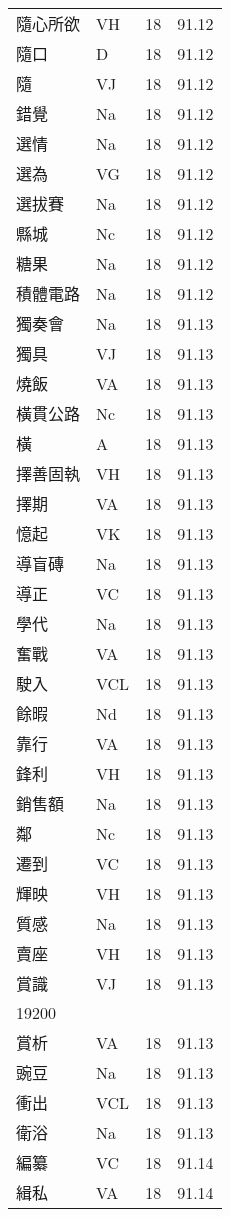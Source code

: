 \documentclass[twocolumn]{book}
\begin{document}
\begin{supertabular}{llrr}
隨心所欲 & VH & 18 &  91.12\\
隨口 & D & 18 &  91.12\\
隨 & VJ & 18 &  91.12\\
錯覺 & Na & 18 &  91.12\\
選情 & Na & 18 &  91.12\\
選為 & VG & 18 &  91.12\\
選拔賽 & Na & 18 &  91.12\\
縣城 & Nc & 18 &  91.12\\
糖果 & Na & 18 &  91.12\\
積體電路 & Na & 18 &  91.12\\
獨奏會 & Na & 18 &  91.13\\
獨具 & VJ & 18 &  91.13\\
燒飯 & VA & 18 &  91.13\\
橫貫公路 & Nc & 18 &  91.13\\
橫 & A & 18 &  91.13\\
擇善固執 & VH & 18 &  91.13\\
擇期 & VA & 18 &  91.13\\
憶起 & VK & 18 &  91.13\\
導盲磚 & Na & 18 &  91.13\\
導正 & VC & 18 &  91.13\\
學代 & Na & 18 &  91.13\\
奮戰 & VA & 18 &  91.13\\
駛入 & VCL & 18 &  91.13\\
餘暇 & Nd & 18 &  91.13\\
靠行 & VA & 18 &  91.13\\
鋒利 & VH & 18 &  91.13\\
銷售額 & Na & 18 &  91.13\\
鄰 & Nc & 18 &  91.13\\
遷到 & VC & 18 &  91.13\\
輝映 & VH & 18 &  91.13\\
質感 & Na & 18 &  91.13\\
賣座 & VH & 18 &  91.13\\
賞識 & VJ & 18 &  91.13\\
19200\\
賞析 & VA & 18 &  91.13\\
豌豆 & Na & 18 &  91.13\\
衝出 & VCL & 18 &  91.13\\
衛浴 & Na & 18 &  91.13\\
編纂 & VC & 18 &  91.14\\
緝私 & VA & 18 &  91.14\\

\end{supertabular}
\end{document}
